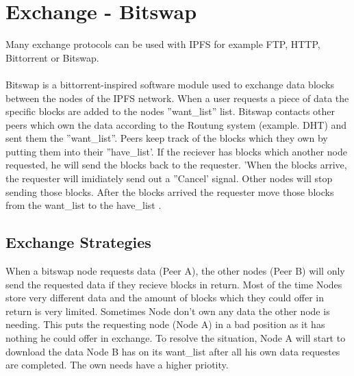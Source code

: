 \documentclass[a4paper,11pt, oneside]{report}
\theoremstyle{definition}
\begin{document}
\newpage

\newpage
\section{Exchange - Bitswap}
Many exchange protocols can be used with IPFS for example FTP, HTTP, Bittorrent or Bitswap.\\ \\
Bitswap is a bittorrent-inspired software module used to exchange data blocks between the nodes of the IPFS network. When a user requests a piece of data the specific blocks are added to the nodes ''want\_list'' list. Bitswap contacts other peers which own the data according to the Routung system (example. DHT) and sent them the ''want\_list''. Peers keep track of the blocks which they own by putting them into their ''have\_list'. If the reciever has blocks which another node requested, he will send the blocks back to the requester. 'When the blocks arrive, the requester will imidiately send out a ''Cancel' signal. Other nodes will stop sending those blocks. After the blocks arrived the requester move those blocks from the want\_list to the have\_list  \cite{bitswap}.

\subsection{Exchange Strategies}
When a bitswap node requests data (Peer A), the other nodes (Peer B) will only send the requested data if they recieve blocks in return. Most of the time Nodes store very different data and the amount of blocks which they could offer in return is very limited. Sometimes Node don't own any data the other node is needing. This puts the requesting node (Node A) in a bad position as it has nothing he could offer in exchange. To resolve the situation, Node A will start to download the data Node B has on its want\_list  after all his own data requestes are completed.  The own needs have a higher priotity.\\ \\
\end{document}
